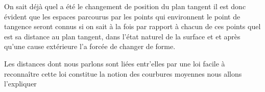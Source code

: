 \documentclass[11pt,a4paper]{article}
\begin{document}
On sait déjà quel a été le changement de position du plan tangent il
est donc évident que les espaces parcourus par les points qui
environnent le point de tangence seront connus si on sait à la fois
par rapport à chacun de ces points quel est sa distance au plan
tangent, dans l'état naturel de la surface et 
et après qu'une cause extérieure l'a forcée de changer de forme.

Les distances dont nous parlons sont liées entr'elles par une loi
facile à reconnaître cette loi constitue la notion des courbures
moyennes nous allons l'expliquer

\ill{}
\end{document}
